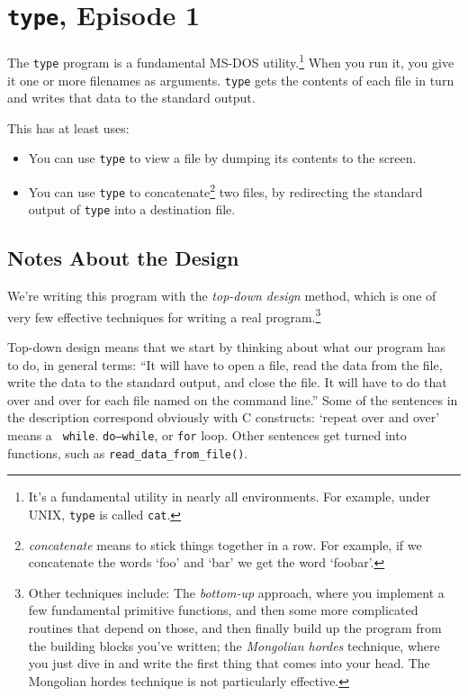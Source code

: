 \section{{\tt type}, Episode 1}

The {\tt type} program is a fundamental MS-DOS utility.\footnote{It's a
fundamental utility in nearly all environments.  For example, under {\sc
UNIX}, {\tt type} is called {\tt cat}.}  When you run it, you give it
one or more filenames as arguments.  {\tt type} gets the contents of
each file in turn and writes that data to the standard output.  

This has at least uses:

\begin{itemize}
\item You can use {\tt type} to view a file by dumping its contents to
the screen.
\item You can use {\tt type} to concatenate\footnote{{\em concatenate}
means to stick things together in a row.  For example, if we concatenate
the words `foo' and `bar' we get the word `foobar'.} two files, by
redirecting the standard output of {\tt type} into a destination file.
\end{itemize}

\subsection{Notes About the Design}

We're writing this program with the {\em top-down design}\/ method,
which is one of very few effective techniques for writing a real
program.\footnote{Other techniques include: The {\em bottom-up}\/
approach, where you implement a few fundamental primitive functions, and
then some more complicated routines that depend on those, and then
finally build up the program from the building blocks you've written;
the {\em Mongolian hordes}\/ technique, where you just dive in and write
the first thing that comes into your head.  The Mongolian hordes
technique is not particularly effective.}  

Top-down design means that we start by thinking about what our program
has to do, in general terms:  ``It will have to open a file, read the
data from the file, write the data to the standard output, and close the
file.  It will have to do that over and over for each file named on the
command line.''  Some of the sentences in the description correspond
obviously with C constructs:  `repeat over and over' means a {\tt
while}. {\tt do{\rm--}while}, or {\tt for} loop.  Other sentences get
turned into functions, such as {\tt read\_data\_from\_file()}.

